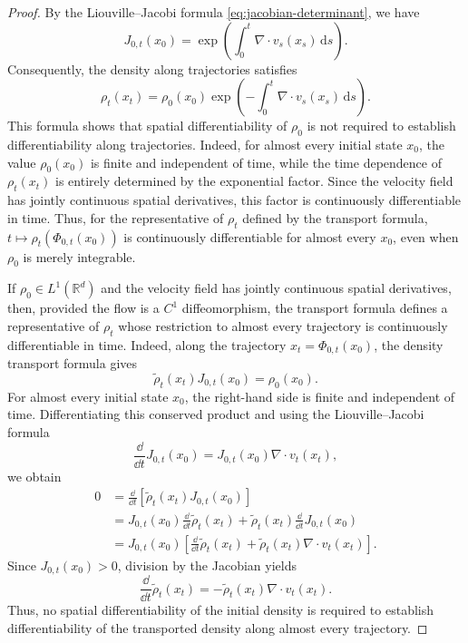 \documentclass[12pt,a4paper,oneside]{book}
\begin{document}
\begin{proof}
By the Liouville--Jacobi formula \eqref{eq:jacobian-determinant}, we have
\begin{equation*}
    J_{0,t}(x_0) = \exp
        \left(
            \int_0^t\nabla\cdot v_s(x_s)\,\mathrm ds
        \right).
\end{equation*}
Consequently, the density along trajectories satisfies
\begin{equation*}
    \rho_t(x_t) = \rho_0(x_0) \exp
        \left(
            -\int_0^t\nabla\cdot v_s(x_s)\,\mathrm ds
        \right).
\end{equation*}
This formula shows that spatial differentiability of $\rho_0$ is not required to establish differentiability along trajectories.
Indeed, for almost every initial state $x_0$, the value $\rho_0(x_0)$ is finite and independent of time, while the time 
dependence of $\rho_t(x_t)$ is entirely determined by the exponential factor. Since the velocity field has jointly continuous 
spatial derivatives, this factor is continuously differentiable in time. Thus, for the representative of $\rho_t$ defined 
by the transport formula, $t\mapsto\rho_t(\Phi_{0,t}(x_0))$ is continuously differentiable for almost every $x_0$, even 
when $\rho_0$ is merely integrable.


If $\rho_0\in L^1(\mathbb R^d)$ and the velocity field has jointly continuous spatial derivatives, then, provided the flow
is a $C^1$ diffeomorphism, the transport formula defines a representative of $\rho_t$ whose restriction to almost every
trajectory is continuously differentiable in time. Indeed, along the trajectory $x_t=\Phi_{0,t}(x_0)$, the density transport 
formula gives
\begin{equation*}
    \widetilde\rho_t(x_t)J_{0,t}(x_0)=\rho_0(x_0).
\end{equation*}
For almost every initial state $x_0$, the right-hand side is finite and independent of time. Differentiating this conserved
product and using the Liouville--Jacobi formula
\begin{equation*}
    \frac{\dd}{\dd t}J_{0,t}(x_0)
    =J_{0,t}(x_0)\nabla\cdot v_t(x_t),
\end{equation*}
we obtain
\begin{equation*}
    \begin{aligned}
        0 &=\frac{\dd}{\dd t} \left[\widetilde\rho_t(x_t)J_{0,t}(x_0)\right]\\
        &=J_{0,t}(x_0) \frac{\dd}{\dd t}\widetilde\rho_t(x_t) +\widetilde\rho_t(x_t)\frac{\dd}{\dd t}J_{0,t}(x_0)\\
        &=J_{0,t}(x_0)
            \left[
                \frac{\dd}{\dd t}\widetilde\rho_t(x_t) + \widetilde\rho_t(x_t)\nabla\cdot v_t(x_t)
            \right].
    \end{aligned}
\end{equation*}
Since $J_{0,t}(x_0)>0$, division by the Jacobian yields
\begin{equation*}
    \frac{\dd}{\dd t}\widetilde\rho_t(x_t) = -\widetilde\rho_t(x_t)\nabla\cdot v_t(x_t).
\end{equation*}
Thus, no spatial differentiability of the initial density is required to establish differentiability of the transported
density along almost every trajectory.


\end{proof}
\end{document}
